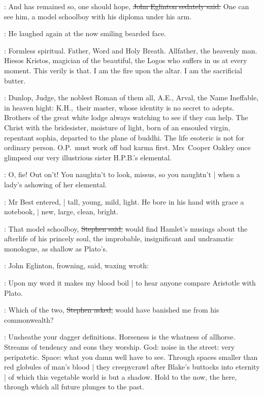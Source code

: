 \eglinton:
And has remained so,
one should hope,
\sout{John Eglinton sedately said.}
One can see him,
a model schoolboy with his diploma under his arm.

:
He laughed again
at the now smiling bearded face.

\StephenInt:
Formless spiritual.
Father, Word and Holy Breath.
Allfather, the heavenly man.
Hiesos Kristos, magician of the beautiful,
the Logos who suffers in us at every moment.
This verily is that.
I am the fire upon the altar.
I am the sacrificial butter.

\StephenInt:
Dunlop,
Judge,
the noblest Roman of them all,
A.E.,
Arval,
the Name Ineffable,
in heaven hight:
K.H.,~their master,
whose identity is no secret to adepts.
Brothers of the great white lodge
always watching to see if they can help.
The Christ with the bridesister,
moisture of light,
born of an ensouled virgin,
repentant sophia,
departed to the plane of buddhi.
The life esoteric is not for ordinary person.
O.P.~must work off bad karma first.
Mrs~Cooper Oakley once glimpsed
our very illustrious sister H.P.B.'s elemental.

\StephenInt:
O, fie!
Out on't!
You naughtn't to look, missus,
so you naughtn't |
when a lady's ashowing of her elemental.

:
Mr Best entered, |
tall, young, mild, light.
He bore in his hand with grace a notebook, |
new, large, clean, bright.

\Stephen:
That model schoolboy,
\sout{Stephen said,}
would find Hamlet's musings about the afterlife of his princely soul,
the improbable,
insignificant and undramatic monologue,
as shallow as Plato's.

:
John Eglinton,
frowning, said, waxing wroth:

\eglinton:
Upon my word
it makes my blood boil |
to hear anyone compare Aristotle with Plato.

\Stephen:
Which of the two,
\sout{Stephen asked,}
would have banished me from his commonwealth?

\StephenInt:
Unsheathe your dagger definitions.
Horseness is the whatness of allhorse.
Streams of tendency and eons they worship.
God: noise in the street:
very peripatetic.
Space: what you damn well have to see.
Through spaces smaller than red globules of man's blood |
they creepycrawl after Blake's buttocks into eternity |
of which this vegetable world is but a shadow.
Hold to the now,
the here,
through which all future plunges to the past.

